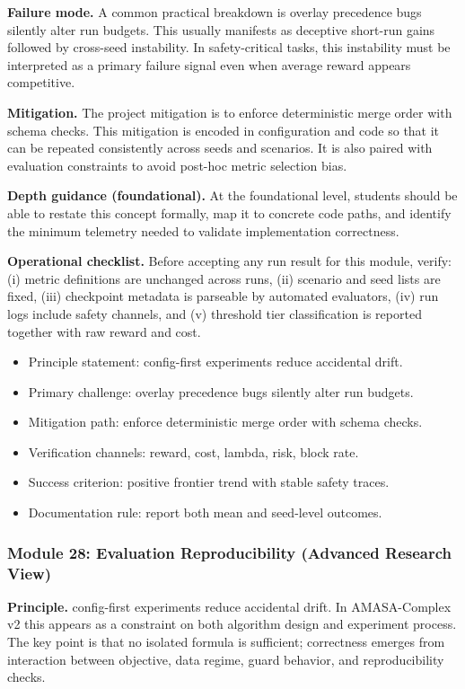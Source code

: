 \documentclass[conference]{IEEEtran}
\begin{document}
\textbf{Failure mode.} A common practical breakdown is overlay precedence bugs silently alter run budgets. This usually manifests as deceptive short-run gains followed by cross-seed instability. In safety-critical tasks, this instability must be interpreted as a primary failure signal even when average reward appears competitive.

\textbf{Mitigation.} The project mitigation is to enforce deterministic merge order with schema checks. This mitigation is encoded in configuration and code so that it can be repeated consistently across seeds and scenarios. It is also paired with evaluation constraints to avoid post-hoc metric selection bias.

\textbf{Depth guidance (foundational).} At the foundational level, students should be able to restate this concept formally, map it to concrete code paths, and identify the minimum telemetry needed to validate implementation correctness.

\textbf{Operational checklist.} Before accepting any run result for this module, verify: (i) metric definitions are unchanged across runs, (ii) scenario and seed lists are fixed, (iii) checkpoint metadata is parseable by automated evaluators, (iv) run logs include safety channels, and (v) threshold tier classification is reported together with raw reward and cost.

\begin{itemize}[leftmargin=*]
  \item Principle statement: config-first experiments reduce accidental drift.
  \item Primary challenge: overlay precedence bugs silently alter run budgets.
  \item Mitigation path: enforce deterministic merge order with schema checks.
  \item Verification channels: reward, cost, lambda, risk, block rate.
  \item Success criterion: positive frontier trend with stable safety traces.
  \item Documentation rule: report both mean and seed-level outcomes.
\end{itemize}


\subsubsection{Module 28: Evaluation Reproducibility (Advanced Research View)}
\textbf{Principle.} config-first experiments reduce accidental drift. In AMASA-Complex v2 this appears as a constraint on both algorithm design and experiment process. The key point is that no isolated formula is sufficient; correctness emerges from interaction between objective, data regime, guard behavior, and reproducibility checks.
\end{document}
